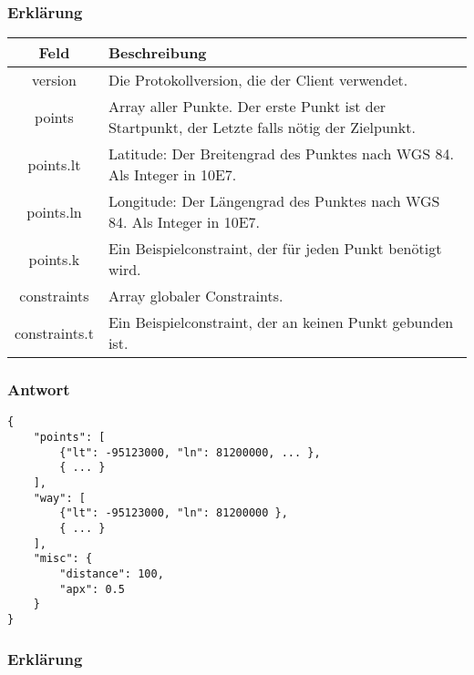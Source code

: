 \documentclass[ngerman,titlepage,parskip=true]{scrartcl}
\begin{document}
		\subsubsection*{Erklärung}
	
	    \noindent \begin{tabular}{|c|p{12cm}|}
	    	\hline
	    	\textbf{Feld} & \textbf{Beschreibung} \\ 
	    	\hline \hline
	    	
	    	version & Die Protokollversion, die der Client verwendet.\\
	    	\hline
	    	
	    	points & Array aller Punkte. Der erste Punkt ist der Startpunkt, der Letzte falls nötig der Zielpunkt. \\ 
	    	\hline
	    	
	    	points.lt & Latitude: Der Breitengrad des Punktes nach WGS 84. Als Integer in 10E7. \\ 
	    	\hline
	    	
	    	points.ln & Longitude: Der Längengrad des Punktes nach WGS 84. Als Integer in 10E7. \\
	    	\hline
	    	
	    	points.k & Ein Beispielconstraint, der für jeden Punkt benötigt wird.\\ 
	    	\hline
	    	
	    	constraints & Array globaler Constraints.\\ 
	    	\hline
	    	
	    	constraints.t & Ein Beispielconstraint, der an keinen Punkt gebunden ist.\\ 
	    	\hline
	    \end{tabular}
    
    \subsubsection{Antwort}	
	\begin{lstlisting}
{
	"points": [
		{"lt": -95123000, "ln": 81200000, ... },
		{ ... }
	],
	"way": [
		{"lt": -95123000, "ln": 81200000 },
		{ ... }
	],
	"misc": {
		"distance": 100,
		"apx": 0.5
	}
}
	\end{lstlisting}
	
		\subsubsection*{Erklärung}
		
\end{document}
